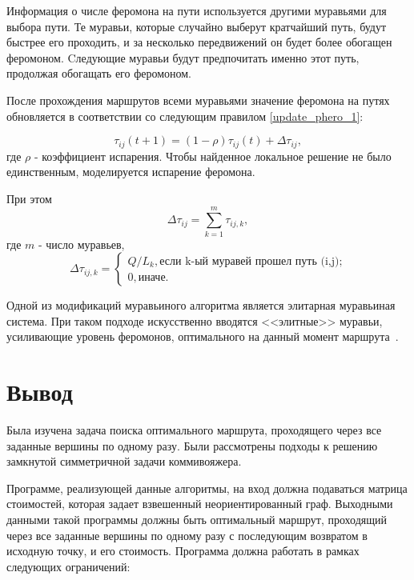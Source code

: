 Информация о числе феромона на пути используется другими муравьями для выбора пути. Те муравьи, которые случайно выберут кратчайший путь, будут быстрее его проходить, и за несколько передвижений он будет более обогащен феромоном. Cледующие муравьи будут предпочитать именно этот путь, продолжая обогащать его феромоном. 

После прохождения маршрутов всеми муравьями значение феромона на путях обновляется в соответствии со следующим правилом \eqref{update_phero_1}:

\begin{equation}
	\label{update_phero_1}
		\tau_{ij}(t+1) = (1-\rho)\tau_{ij}(t) + \Delta \tau_{ij},
\end{equation}
где $\rho$ - коэффициент испарения. Чтобы найденное локальное решение не было единственным, моделируется испарение феромона.

При этом
\begin{equation}
\label{update_phero_2}
 \Delta \tau_{ij} = \sum_{k=1}^m \tau_{ij, k},
\end{equation}
где $m$ - число муравьев,
\begin{equation}
	\label{update_phero_3}
		 \Delta\tau_{ij,k} = \begin{cases}
		Q/L_{k}, \textrm{если k-ый муравей прошел путь (i,j);} \\
		0, \textrm{иначе.}
	\end{cases}
\end{equation}

Одной из модификаций муравьиного алгоритма является элитарная муравьиная система.
При таком подходе искусственно вводятся <<элитные>> муравьи, усиливающие уровень феромонов, оптимального на данный момент маршрута~\cite{elite-ants-alg}.

\section{Вывод}

Была изучена задача поиска оптимального маршрута, проходящего через все заданные вершины по одному разу. Были рассмотрены подходы к решению замкнутой симметричной задачи коммивояжера.

Программе, реализующей данные алгоритмы, на вход должна подаваться матрица стоимостей, которая задает взвешенный неориентированный граф. Выходными данными такой программы должны быть оптимальный маршрут, проходящий через все заданные вершины по одному разу с последующим возвратом в исходную точку, и его стоимость. Программа должна работать в рамках следующих ограничений: 

